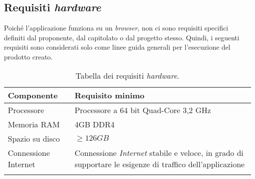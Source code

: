 \subsection{Requisiti \textit{hardware}}
Poiché l'applicazione funziona su un \textit{browser}, non ci sono requisiti specifici definiti dal proponente, dal capitolato o dal progetto stesso. 
Quindi, i seguenti requisiti sono considerati solo come linee guida generali per l'esecuzione del prodotto creato.

\begin{longtable}{|l|p{}|}
	\hline
	\textbf{Componente}       & \textbf{ Requisito minimo}   \\
	\hline
     Processore             &  Processore a 64 bit Quad-Core 3,2 GHz      \\
    \hline
     Memoria RAM            &  4GB DDR4       \\
    \hline
    Spazio su disco         & $ \geq  126 GB$         \\
    \hline
    Connessione Internet         & Connessione \textit{Internet} stabile e veloce, in grado di supportare le esigenze di traffico dell'applicazione         \\
    \hline

    \caption{Tabella dei requisiti \textit{hardware}.}
\end{longtable}